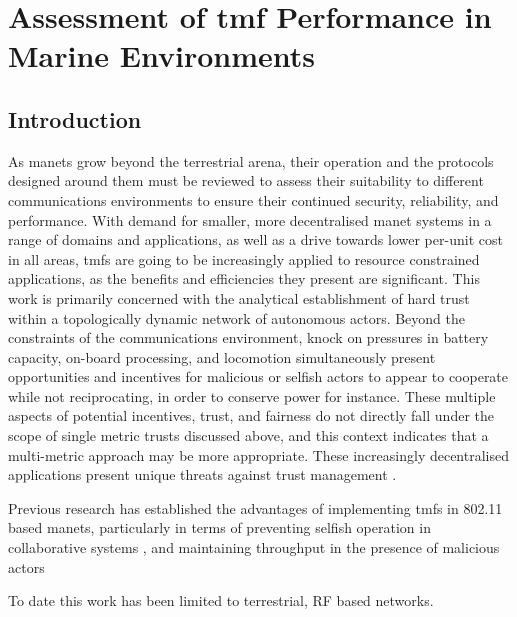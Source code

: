 \def\ChapterTitle{Assessment of \gls{tmf} Performance in Marine Environments}

\chapter{\ChapterTitle}
\label{Chapter\thechapter}


\section{Introduction}


As \glspl{manet} grow beyond the terrestrial arena, their operation and the protocols designed around them must be reviewed to assess their suitability to different communications environments to ensure their continued security, reliability, and performance.
With demand for smaller, more decentralised \gls{manet} systems in a range of domains and applications, as well as a drive towards lower per-unit cost in all areas, \glspl{tmf} are going to be increasingly applied to resource constrained applications, as the benefits and efficiencies they present are significant.
This work is primarily concerned with the analytical establishment of hard trust within a topologically dynamic network of autonomous actors.
Beyond the constraints of the communications environment, knock on pressures in battery capacity, on-board processing, and locomotion simultaneously present opportunities and incentives for malicious or selfish actors to appear to cooperate while not reciprocating, in order to conserve power for instance.
These multiple aspects of potential incentives, trust, and fairness do not directly fall under the scope of single metric trusts discussed above, and this context indicates that a multi-metric approach may be more appropriate.
These increasingly decentralised applications present unique threats against trust management \cite{Caiti2011}.

Previous research has established the advantages of implementing \glspl{tmf} in 802.11 based \glspl{manet}, particularly in terms of preventing selfish operation in collaborative systems \cite{Li2007}, and maintaining throughput in the presence of malicious actors \cite{Buchegger2002}

To date this work has been limited to terrestrial, RF based networks. 

